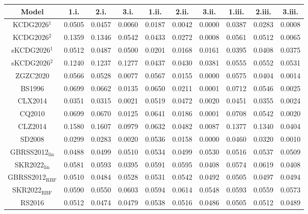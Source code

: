 
\begin{tabular}{cccccccccc}
\hline
Model & 1.i. & 2.i. & 3.i. & 1.ii. & 2.ii. & 3.ii. & 1.iii. & 2.iii. & 3.iii.\\
\hline
KCDG2026$^1$ & 0.0505 & 0.0457 & 0.0060 & 0.0187 & 0.0042 & 0.0000 & 0.0387 & 0.0283 & 0.0008\\
KCDG2026$^2$ & 0.1359 & 0.1346 & 0.0542 & 0.0433 & 0.0272 & 0.0008 & 0.0561 & 0.0512 & 0.0065\\
sKCDG2026$^1$ & 0.0512 & 0.0487 & 0.0500 & 0.0201 & 0.0168 & 0.0161 & 0.0395 & 0.0408 & 0.0375\\
sKCDG2026$^2$ & 0.1240 & 0.1237 & 0.1277 & 0.0437 & 0.0430 & 0.0381 & 0.0555 & 0.0552 & 0.0531\\
ZGZC2020 & 0.0566 & 0.0528 & 0.0077 & 0.0567 & 0.0155 & 0.0000 & 0.0575 & 0.0404 & 0.0014\\

BS1996 & 0.0699 & 0.0662 & 0.0135 & 0.0650 & 0.0211 & 0.0001 & 0.0712 & 0.0546 & 0.0025\\
CLX2014 & 0.0351 & 0.0315 & 0.0021 & 0.0519 & 0.0472 & 0.0020 & 0.0451 & 0.0355 & 0.0024\\
CQ2010 & 0.0699 & 0.0670 & 0.0125 & 0.0641 & 0.0186 & 0.0001 & 0.0708 & 0.0542 & 0.0020\\
CLZ2014 & 0.1580 & 0.1607 & 0.0979 & 0.0632 & 0.0482 & 0.0087 & 0.1377 & 0.1340 & 0.0404\\
SD2008 & 0.0299 & 0.0283 & 0.0020 & 0.0536 & 0.0158 & 0.0000 & 0.0460 & 0.0320 & 0.0010\\

GBRSS2012$_{\text{lin}}$ & 0.0488 & 0.0499 & 0.0510 & 0.0534 & 0.0499 & 0.0530 & 0.0516 & 0.0537 & 0.0509\\
SKR2022$_{\text{lin}}$ & 0.0581 & 0.0593 & 0.0395 & 0.0591 & 0.0595 & 0.0408 & 0.0574 & 0.0619 & 0.0408\\
GBRSS2012$_{\text{RBF}}$ & 0.0510 & 0.0484 & 0.0528 & 0.0531 & 0.0542 & 0.0492 & 0.0505 & 0.0497 & 0.0494\\
SKR2022$_{\text{RBF}}$ & 0.0590 & 0.0550 & 0.0603 & 0.0594 & 0.0614 & 0.0548 & 0.0593 & 0.0559 & 0.0573\\
RS2016 & 0.0512 & 0.0474 & 0.0479 & 0.0538 & 0.0516 & 0.0486 & 0.0505 & 0.0512 & 0.0489\\
\hline
\end{tabular}
